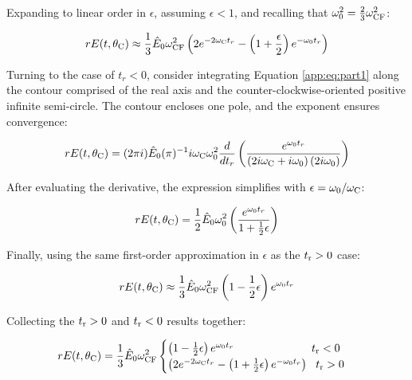 \documentclass[amsmath,amssymb,aps,prd,10pt,twocolumn]{revtex4}
\begin{document}
Expanding to linear order in $\epsilon$, assuming $\epsilon < 1$, and recalling that $\omega_{\rm 0}^2 = \frac{2}{3}\omega_{\rm CF}^2$:

\begin{equation}
r E(t,\theta_{\rm C}) \approx \frac{1}{3} \hat{E}_0 \omega_{\rm CF}^2 \left( 2 e^{-2\omega_{\rm C} t_r} - \left(1+\frac{\epsilon}{2} \right) e^{-\omega_{\rm 0}t_r} \right)
\end{equation}

Turning to the case of $t_r < 0$, consider integrating Equation \ref{app:eq:part1} along the contour comprised of the real axis and the counter-clockwise-oriented positive infinite semi-circle.  The contour encloses one pole, and the exponent ensures convergence:

\begin{equation}
r E(t,\theta_{\rm C}) = (2\pi i)\hat{E}_0 (\pi)^{-1} i \omega_{\rm C} \omega_{\rm 0}^2 \frac{d}{dt_r}\left( \frac{ e^{\omega_{\rm 0} t_r}}{ \left(2 i \omega_{\rm C} + i\omega_{\rm 0} \right) (2i\omega_{\rm 0}) } \right)
\end{equation}

After evaluating the derivative, the expression simplifies with $\epsilon = \omega_0/\omega_{\rm C}$:

\begin{equation}
r E(t,\theta_{\rm C}) = \frac{1}{2} \hat{E}_0 \omega_{\rm 0}^2  \left( \frac{ e^{\omega_{\rm 0} t_r} }{1 + \frac{1}{2}\epsilon } \right) \label{app:eq:yes_eps2}
\end{equation}

Finally, using the same first-order approximation in $\epsilon$ as the $t_{\rm r} > 0$ case:

\begin{equation}
r E(t,\theta_{\rm C}) \approx \frac{1}{3} \hat{E}_0 \omega_{\rm CF}^2  \left(1 - \frac{1}{2}\epsilon \right)e^{\omega_{\rm 0} t_r}
\end{equation}

Collecting the $t_{\rm r} > 0$ and $t_{\rm r} < 0$ results together:

\begin{widetext}
\begin{equation}
r E(t,\theta_{\rm C}) = \frac{1}{3} \hat{E}_0 \omega_{\rm CF}^2
\begin{cases}
\left(1 - \frac{1}{2}\epsilon \right)e^{\omega_{\rm 0} t_r} ~~~~~~~~~~~~~~~~~~~~~ t_{\rm r} < 0 \\
\left( 2 e^{-2\omega_{\rm C} t_r} - \left(1+\frac{1}{2}\epsilon \right) e^{-\omega_{\rm 0}t_r} \right) ~~ t_{\rm r} > 0
\end{cases}
\label{app:eq:on_cone}
\end{equation}
\end{widetext}
\end{document}

